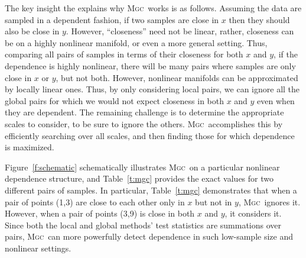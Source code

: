\documentclass[11pt]{article}
\providecommand{\sct}[1]{{\normalfont\textsc{#1}}}
\newcommand{\Mgc}{\sct{Mgc}}
\begin{document}
The key insight the explains why \Mgc~works is as follows.  
Assuming the data are sampled in a dependent fashion,  if two samples are close in $x$ then they should also be close in $y$.  However, ``closeness'' need not be linear, rather, closeness can be on a highly nonlinear manifold, or even a more general setting.  Thus,  comparing all pairs of samples in terms of their closeness for both $x$ and $y$, if the dependence is highly nonlinear, there will be many pairs where samples are only close in $x$ or $y$, but not both.  
However, nonlinear manifolds can be approximated by locally linear ones.  
Thus, by only considering local pairs, we can ignore all the global pairs for which we would not expect closeness in both $x$ and $y$ even when they are dependent.  
The remaining challenge is to determine the appropriate scales to consider, to be sure to ignore the others.  \Mgc~accomplishes this by efficiently searching over all scales, and then finding those for which dependence is maximized.  



Figure~\ref{f:schematic} schematically illustrates \Mgc~on a particular nonlinear dependence structure, and Table~\ref{t:mgc} provides the exact values for two different pairs of samples.  In particular, Table~\ref{t:mgc} demonstrates that when a pair of points (1,3) are close to each other only in $x$ but not in $y$, \Mgc~ignores it.  However, when a pair of points (3,9) is close in both $x$ and $y$, it considers it.  Since both the local and global methods' test statistics are summations over pairs,  \Mgc~can more powerfully detect dependence in such low-sample size and nonlinear settings.
\end{document}
